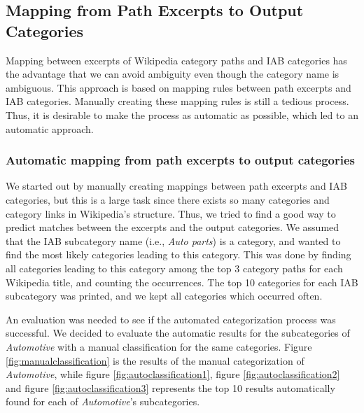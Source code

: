 \subsection{Mapping from Path Excerpts to Output Categories}
Mapping between excerpts of Wikipedia category paths and IAB categories has the advantage that we can avoid ambiguity even though the category name is ambiguous. This approach is based on mapping rules between path excerpts and IAB categories. Manually creating these mapping rules  is still a tedious process. Thus, it is desirable to make the process as automatic as possible, which led to an automatic approach.

\subsubsection{Automatic mapping from path excerpts to output categories}
We started out by manually creating mappings between path excerpts and IAB categories, but this is a large task since there exists so many categories and category links in Wikipedia's structure. Thus, we tried to find a good way to predict matches between the excerpts and the output categories. We assumed that the IAB subcategory name (i.e., \emph{Auto parts}) is a category, and wanted to find the most likely categories leading to this category. This was done by finding all categories leading to this category among the top 3 category paths for each Wikipedia title, and counting the occurrences. The top 10 categories for each IAB subcategory was printed, and we kept all categories which occurred often. 

An evaluation was needed to see if the automated categorization process was successful. We decided to evaluate the automatic results for the subcategories of \emph{Automotive} with a manual classification for the same categories. Figure \ref{fig:manualclassification} is the results of the manual categorization of \emph{Automotive}, while figure \ref{fig:autoclassification1}, figure \ref{fig:autoclassification2} and figure \ref{fig:autoclassification3} represents the top 10 results automatically found for each of \emph{Automotive}'s subcategories.


